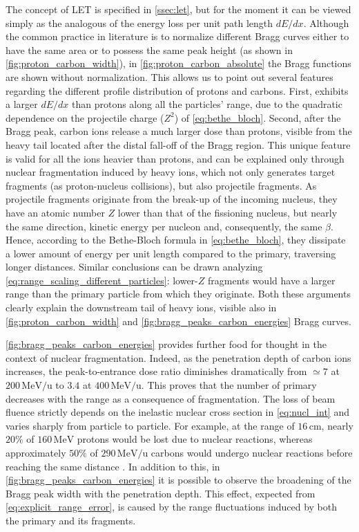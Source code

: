 The concept of LET is specified in \autoref{ssec:let}, but for the moment it can be viewed simply as the analogous of the energy loss per unit path length $dE/dx$. Although the common practice in literature is to normalize different Bragg curves either to have the same area or to possess the same peak height (as shown in \autoref{fig:proton_carbon_width}), in \autoref{fig:proton_carbon_absolute} the Bragg functions are shown without normalization. This allows us to point out several features regarding the different profile distribution of protons and carbons. First,  exhibits a larger $dE/dx$ than protons along all the particles' range, due to the quadratic dependence on the projectile charge ($Z^2$) of \autoref{eq:bethe_bloch}. Second, after the Bragg peak, carbon ions release a much larger dose than protons, visible from the heavy tail located after the distal fall-off of the Bragg region. This unique feature is valid for all the ions heavier than protons, and can be explained only through nuclear fragmentation induced by heavy ions, which not only generates target fragments (as proton-nucleus collisions), but also projectile fragments. As projectile fragments originate from the break-up of the incoming nucleus, they have an atomic number $Z$ lower than that of the fissioning nucleus, but nearly the same direction, kinetic energy per nucleon and, consequently, the same $\beta$. Hence, according to the Bethe-Bloch formula in \autoref{eq:bethe_bloch}, they dissipate a lower amount of energy per unit length compared to the primary, traversing longer distances. Similar conclusions can be drawn analyzing \autoref{eq:range_scaling_different_particles}: lower-$Z$ fragments would have a larger range than the primary particle from which they originate. Both these arguments clearly explain the downstream tail of heavy ions, visible also in \autoref{fig:proton_carbon_width} and \autoref{fig:bragg_peaks_carbon_energies} Bragg curves.

\autoref{fig:bragg_peaks_carbon_energies} provides further food for thought in the context of nuclear fragmentation. Indeed, as the penetration depth of carbon ions increases, the peak-to-entrance dose ratio diminishes dramatically from $\simeq7$ at $200\,\mathrm{MeV/u}$ to $3.4$ at $400\,\mathrm{MeV/u}$. This proves that the number of primary  decreases with the range as a consequence of fragmentation. The loss of beam fluence strictly depends on the inelastic nuclear cross section in \autoref{eq:nucl_int} and varies sharply from particle to particle. For example, at the range of $16\,\mathrm{cm}$, nearly $20\%$ of $160\,\mathrm{MeV}$ protons would be lost due to nuclear reactions, whereas approximately $50\%$ of $290\,\mathrm{MeV/u}$ carbons would undergo nuclear reactions before reaching the same distance \cite{rangeVerification}. In addition to this, in \autoref{fig:bragg_peaks_carbon_energies} it is possible to observe the broadening of the Bragg peak width with the penetration depth. This effect, expected from \autoref{eq:explicit_range_error}, is caused by the range fluctuations induced by both the primary and its fragments.

